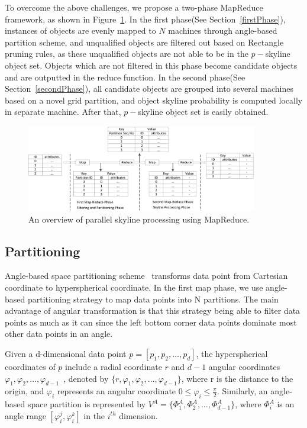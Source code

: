 To overcome the above challenges, we propose a two-phase MapReduce framework, as shown in Figure~\ref{figure:framework}. In the first phase(See Section~\ref{firstPhase}), instances of objects are evenly mapped to $N$ machines through angle-based partition scheme, and unqualified objects are filtered out based on Rectangle pruning rules, as these unqualified objects are not able to be in the $p-$skyline object set. Objects which are not filtered in this phase become candidate objects and are outputted in the reduce function. In the second phase(See Section~\ref{secondPhase}), all candidate objects are grouped into several machines based on a novel grid partition, and object skyline probability is computed locally in separate machine. After that, $p-$skyline object set is easily obtained.
\begin{figure}[t]
\centering
  \includegraphics[width=0.9\textwidth]{figs/framework.eps}
  \vspace*{-10pt}
  \caption{An overview of parallel skyline processing using MapReduce.}
  \vspace*{-15pt}
  \label{figure:framework}
\end{figure}

\subsection{Partitioning}

Angle-based space partitioning scheme~\cite{ref:AngularPartition} transforms data point from Cartesian coordinate to hyperspherical coordinate. In the first map phase, we use angle-based partitioning strategy to map data points into N partitions. The main advantage of angular transformation is that this strategy being able to filter data points as much as it can since the left bottom corner data points dominate most other data points in an angle.

Given a d-dimensional data point $p = [p_1, p_2, \dots, p_d]$, the hyperspherical coordinates of $p$ include a radial coordinate $r$ and $d-1$ angular coordinates $\varphi_1, \varphi_2, \dots, \varphi_{d-1}$~\cite{ref:AngularPartition}, denoted by $\{r, \varphi_1, \varphi_2, \dots, \varphi_{d-1}\}$, where r is the distance to the origin, and $\varphi_i$ represents an angular coordinate $ 0 \leq  \varphi_i \leq \frac{\pi}{2}$. Similarly, an angle-based space partition is represented by $V^A = \{\Phi_1^A, \Phi_2^A, \dots, \Phi_{d-1}^A \}$, where $\Phi_i^A$ is an angle range $[\varphi_i^j,\varphi_i^k]$ in the $i^{th}$ dimension.

